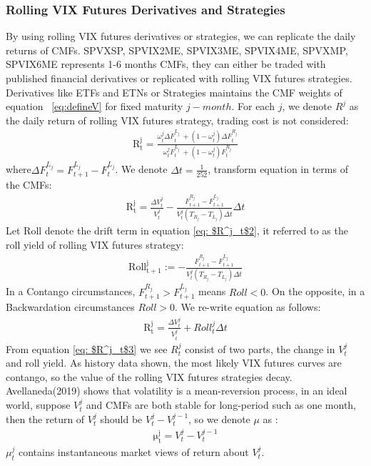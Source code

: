 \documentclass[10pt,letterpaper]{article}
\begin{document}
\subsubsection*{Rolling VIX Futures Derivatives and Strategies}
By using rolling VIX futures derivatives or strategies, we can replicate the daily returns of CMFs.
SPVXSP, SPVIX2ME, SPVIX3ME, SPVIX4ME, SPVXMP, SPVIX6ME represents 1-6 months CMFs, they can either be traded with published financial derivatives or replicated with rolling VIX futures strategies.
Derivatives like ETFs and ETNs or Strategies maintains the CMF weights of equation ~\ref{eq:defineV} for fixed maturity $j-month$. For each $j$, we denote $R^j$
as the daily return of rolling VIX futures strategy, trading cost is not considered:
\begin{eqnarray}
    \mathrm{R^j_t} = \frac{\omega^j_t{\Delta}F^{L_j}_t\ + (1 - \omega^j_t){\Delta}F^{R_j}_t}{\omega^j_tF^{L_j}_t\ + (1 - \omega^j_t)F^{R_j}_t}
\end{eqnarray}
where${\Delta}F^{L_j}_t = F^{L_j}_{t+1} - F^{L_j}_t$. We denote ${\Delta}t = \frac{1}{252}$, transform equation in terms of the CMFs:
\begin{eqnarray}
\label{eq: $R^j_t$2}
    \mathrm{R^j_t} = \frac{{\Delta}V^j_t}{V^j_t} - \frac{F^{R_j}_{t+1} - F^{L_j}_{t+1}}{V^j_t(T_{R_j} - T_{L_j}){\Delta}t}{\Delta}t
\end{eqnarray}
Let Roll denote the drift term in equation \ref{eq: $R^j_t$2}, it referred to as the roll yield of rolling VIX futures strategy:
\begin{eqnarray}
\label{roll}
    \mathrm{Roll^j_{t+1}} := - \frac{F^{R_j}_{t+1} - F^{L_j}_{t+1}}{V^j_t(T_{R_j} - T_{L_j}){\Delta}t}
\end{eqnarray}
In a Contango circumstances, $F^{R_j}_{t+1} > F^{L_j}_{t+1}$ means $Roll < 0$. On the opposite, in a Backwardation circumstances $Roll > 0$.
We re-write equation as follows:
\begin{eqnarray}
\label{eq: $R^j_t$3}
    \mathrm{R^j_t} = \frac{{\Delta}V^j_t}{V^j_t} + Roll^j_{t}{\Delta}t
\end{eqnarray}
From equation \ref{eq: $R^j_t$3} we see $R^j_t$ consist of two parts, the change in $V^j_t$ and roll yield. As history data shown, the most likely VIX futures
curves are contango, so the value of the rolling VIX futures strategies decay.
\\Avellaneda(2019) shows that volatility is a mean-reversion process, in an ideal world, suppose $V^j_t$ and CMFs are both stable for long-period such as one month, then
the return of $V^j_t$ should be $V^j_t - V^{j-1}_t$, so we denote $\mu$ as :
\begin{eqnarray}
\label{eq: mu}
    \mathrm{\mu^j_t} = V^j_t - V^{j-1}_t
\end{eqnarray}
$\mu^j_t$ contains instantaneous market views of return about $V^j_t$.
\end{document}
